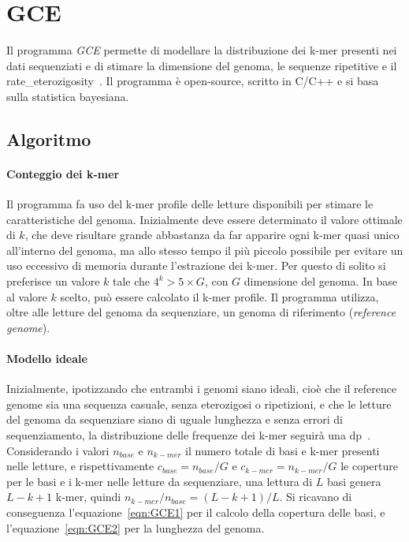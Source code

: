 \documentclass[crop=false, class=book]{standalone}
\begin{document}
	\section{GCE}
	\label{sec:GCE}
	Il programma \textit{GCE} permette di modellare la distribuzione dei k-mer presenti nei dati sequenziati e di stimare la dimensione del genoma, le sequenze ripetitive e il \gls{rate_eterozigosity}~\cite{liu2013GCE}. Il programma è open-source, scritto in C/C++ e si basa sulla statistica bayesiana.
	
	\subsection{Algoritmo}
	\paragraph{Conteggio dei k-mer}
	Il programma fa uso del k-mer profile delle letture disponibili per stimare le caratteristiche del genoma. Inizialmente deve essere determinato il valore ottimale di $k$, che deve risultare grande abbastanza da far apparire ogni k-mer quasi unico all'interno del genoma, ma allo stesso tempo il più piccolo possibile per evitare un uso eccessivo di memoria durante l'estrazione dei k-mer. Per questo di solito si preferisce un valore $k$ tale che $4^k>5 \times G$, con $G$ dimensione del genoma. In base al valore $k$ scelto, può essere calcolato il k-mer profile.
	Il programma utilizza, oltre alle letture del genoma da sequenziare, un genoma di riferimento (\textit{reference genome}).
	
	\paragraph{Modello ideale}
	Inizialmente, ipotizzando che entrambi i genomi siano ideali, cioè che il reference genome sia una sequenza casuale, senza eterozigosi o ripetizioni, e che le letture del genoma da sequenziare siano di uguale lunghezza e senza errori di sequenziamento, la distribuzione delle frequenze dei k-mer seguirà una \gls{dp}~\cite{li2003estimating}. Considerando i valori $n_{base}$ e $n_{k-mer}$ il numero totale di basi e k-mer presenti nelle letture, e rispettivamente $c_{base} = n_{base}/G$ e $c_{k-mer} = n_{k-mer}/G$ le coperture per le basi e i k-mer nelle letture da sequenziare, una lettura di $L$ basi genera $L-k+1$ k-mer, quindi $n_{k-mer} / n_{base} = (L-k+1)/L$. Si ricavano di conseguenza l'equazione~\vref{eqn:GCE1} per il calcolo della copertura delle basi, e l'equazione~\vref{eqn:GCE2} per la lunghezza del genoma.
	
\end{document}
